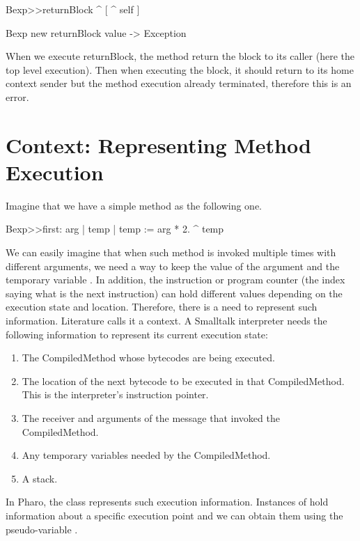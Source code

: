 \documentclass[a4paper,10pt,twoside]{book}
\begin{document}
\begin{code}{}
Bexp>>returnBlock
	^ [ ^ self ]

Bexp new returnBlock value
-> Exception
\end{code}

When we execute returnBlock, the method return the block to its caller (here the top level execution). Then when executing the block, it should return to its home context sender but the method execution already terminated, therefore this is an error.


\section{Context: Representing Method Execution}
Imagine that we have a simple method as the following one.

\begin{code}{}
Bexp>>first: arg
	| temp |
	temp := arg * 2.
	^ temp
\end{code}

We can easily imagine that when such method is invoked multiple times with different arguments, we need a way to keep
the value of the argument  and the temporary variable . In addition, the instruction or program counter (the index saying what is the next instruction) can hold different values depending on the execution state and location. Therefore, there is a need to represent such information. Literature calls it a context. A Smalltalk interpreter needs the following information to represent its current execution state:
\begin{enumerate}
\item The CompiledMethod whose bytecodes are being executed.
\item The location of the next bytecode to be executed in that
CompiledMethod. This is the interpreter's instruction pointer.
\item The receiver and arguments of the message that invoked the
CompiledMethod.
\item Any temporary variables needed by the CompiledMethod.
\item A stack.
\end{enumerate}



In Pharo, the class  represents such execution information. Instances of  hold information about a specific execution point and we can obtain them using the pseudo-variable .
\end{document}
